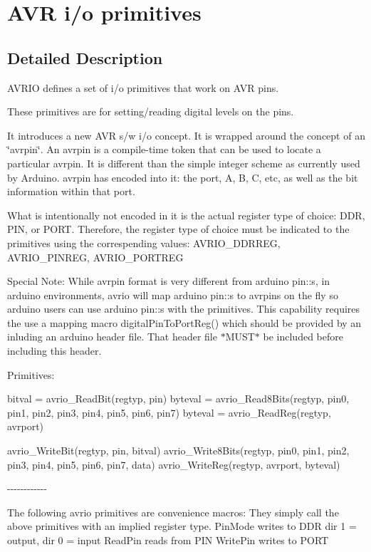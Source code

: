 \hypertarget{group___a_v_r_i_o}{
\section{AVR i/o primitives}
\label{group___a_v_r_i_o}
}


\subsection{Detailed Description}
AVRIO defines a set of i/o primitives that work on AVR pins.

These primitives are for setting/reading digital levels on the pins.

It introduces a new AVR s/w i/o concept. It is wrapped around the concept of an \char`\"{}avrpin\char`\"{}. An avrpin is a compile-\/time token that can be used to locate a particular avrpin. It is different than the simple integer scheme as currently used by Arduino. avrpin has encoded into it: the port, A, B, C, etc, as well as the bit information within that port.

What is intentionally not encoded in it is the actual register type of choice: DDR, PIN, or PORT. Therefore, the register type of choice must be indicated to the primitives using the correspending values: AVRIO\_\-DDRREG, AVRIO\_\-PINREG, AVRIO\_\-PORTREG

Special Note: While avrpin format is very different from arduino pin::s, in arduino environments, avrio will map arduino pin::s to avrpins on the fly so arduino users can use arduino pin::s with the primitives. This capability requires the use a mapping macro digitalPinToPortReg() which should be provided by an inluding an arduino header file. That header file $\ast$MUST$\ast$ be included before including this header.

Primitives:

bitval = avrio\_\-ReadBit(regtyp, pin) byteval = avrio\_\-Read8Bits(regtyp, pin0, pin1, pin2, pin3, pin4, pin5, pin6, pin7) byteval = avrio\_\-ReadReg(regtyp, avrport)

avrio\_\-WriteBit(regtyp, pin, bitval) avrio\_\-Write8Bits(regtyp, pin0, pin1, pin2, pin3, pin4, pin5, pin6, pin7, data) avrio\_\-WriteReg(regtyp, avrport, byteval)

-\/-\/-\/-\/-\/-\/-\/-\/-\/-\/-\/-\/

The following avrio primitives are convenience macros: They simply call the above primitives with an implied register type. PinMode writes to DDR dir 1 = output, dir 0 = input ReadPin reads from PIN WritePin writes to PORT

